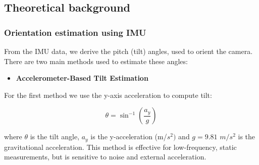 




\subsection{Theoretical background}



\subsubsection{Orientation estimation using IMU}



From the IMU data, we derive the pitch (tilt) angles, used to orient the camera. There are two main methods used to estimate these angles: 

\begin{itemize}
    \item \textbf{Accelerometer-Based Tilt Estimation}
    
\end{itemize}

\noindent
For the first method we use the y-axis acceleration to compute tilt:

\[\theta = \sin^{-1} \left(\frac{a_y}{g}\right) \]

where $\theta$ is the tilt angle, $a_y$ is the y-acceleration (m/$s^2)$ and $g=9.81 $ $m/s^2$ is the gravitational acceleration.
\noindent
This method is effective for low-frequency, static measurements, but is sensitive to noise and external acceleration.

